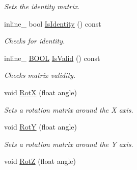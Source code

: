 \begin{DoxyCompactItemize}
\begin{DoxyCompactList}\small\item\em Sets the identity matrix. \end{DoxyCompactList}\item 
inline\+\_\+ bool \hyperlink{classMatrix4x4_aff0d23c65c1d11697b0927386b5fe291}{Is\+Identity} () const \hypertarget{classMatrix4x4_aff0d23c65c1d11697b0927386b5fe291}{}\label{classMatrix4x4_aff0d23c65c1d11697b0927386b5fe291}

\begin{DoxyCompactList}\small\item\em Checks for identity. \end{DoxyCompactList}\item 
inline\+\_\+ \hyperlink{IceTypes_8h_a050c65e107f0c828f856a231f4b4e788}{B\+O\+OL} \hyperlink{classMatrix4x4_a04f8868b9cb0673542cd7e6dfa6c3de0}{Is\+Valid} () const \hypertarget{classMatrix4x4_a04f8868b9cb0673542cd7e6dfa6c3de0}{}\label{classMatrix4x4_a04f8868b9cb0673542cd7e6dfa6c3de0}

\begin{DoxyCompactList}\small\item\em Checks matrix validity. \end{DoxyCompactList}\item 
void \hyperlink{classMatrix4x4_af91a5889c63233947ab803f76d8c0937}{RotX} (float angle)\hypertarget{classMatrix4x4_af91a5889c63233947ab803f76d8c0937}{}\label{classMatrix4x4_af91a5889c63233947ab803f76d8c0937}

\begin{DoxyCompactList}\small\item\em Sets a rotation matrix around the X axis. \end{DoxyCompactList}\item 
void \hyperlink{classMatrix4x4_a4b10603ffbb88969b0b889f5e695800e}{RotY} (float angle)\hypertarget{classMatrix4x4_a4b10603ffbb88969b0b889f5e695800e}{}\label{classMatrix4x4_a4b10603ffbb88969b0b889f5e695800e}

\begin{DoxyCompactList}\small\item\em Sets a rotation matrix around the Y axis. \end{DoxyCompactList}\item 
void \hyperlink{classMatrix4x4_a8effac9d4e833aef88c68a50186b54fa}{RotZ} (float angle)\hypertarget{classMatrix4x4_a8effac9d4e833aef88c68a50186b54fa}{}\label{classMatrix4x4_a8effac9d4e833aef88c68a50186b54fa}


\end{DoxyCompactItemize}

